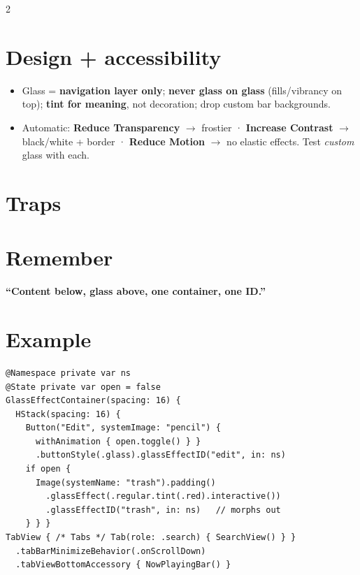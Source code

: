 \documentclass[8pt]{extarticle}
\begin{document}
\begin{multicols}{2}
\section{Design + accessibility}
\begin{itemize}
  \item Glass = \textbf{navigation layer only}; \textbf{never glass on glass} (fills/vibrancy on
        top); \textbf{tint for meaning}, not decoration; drop custom bar backgrounds.
  \item Automatic: \textbf{Reduce Transparency} $\to$ frostier · \textbf{Increase Contrast}
        $\to$ black/white + border · \textbf{Reduce Motion} $\to$ no elastic effects. Test
        \emph{custom} glass with each.
\end{itemize}

\section{Traps}
\begin{itemize}
\end{itemize}

\section{Remember}
\textbf{``Content below, glass above, one container, one ID.''}

\columnbreak

\section{Example}
\begin{lstlisting}[language=SwiftSheet]
@Namespace private var ns
@State private var open = false
GlassEffectContainer(spacing: 16) {
  HStack(spacing: 16) {
    Button("Edit", systemImage: "pencil") {
      withAnimation { open.toggle() } }
      .buttonStyle(.glass).glassEffectID("edit", in: ns)
    if open {
      Image(systemName: "trash").padding()
        .glassEffect(.regular.tint(.red).interactive())
        .glassEffectID("trash", in: ns)   // morphs out
    } } }
TabView { /* Tabs */ Tab(role: .search) { SearchView() } }
  .tabBarMinimizeBehavior(.onScrollDown)
  .tabViewBottomAccessory { NowPlayingBar() }
\end{lstlisting}


\end{multicols}
\end{document}
